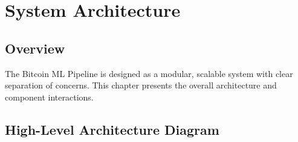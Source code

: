 \chapter{System Architecture}
\label{ch:system_architecture}

\section{Overview}

The Bitcoin ML Pipeline is designed as a modular, scalable system with clear separation of concerns. This chapter presents the overall architecture and component interactions.

\section{High-Level Architecture Diagram}

